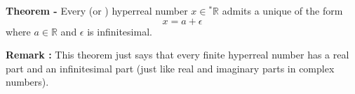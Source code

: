 \documentclass[12pt]{article}
\begin{document}
{\bf Theorem -} Every  (or ) hyperreal number $x \in {}^*\mathbb{R}$ admits a unique  of the form
\begin{displaymath}
x = a + \epsilon
\end{displaymath}
where $a \in \mathbb{R}$ and $\epsilon$ is infinitesimal.

{\bf Remark :} This theorem just says that every finite hyperreal number has a real part and an infinitesimal part (just like real and imaginary parts in complex numbers).
\end{document}
